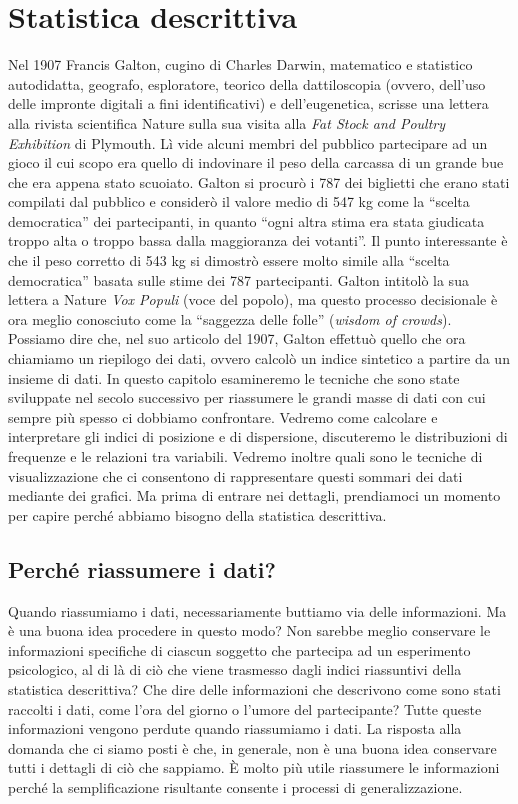 \chapter{Statistica descrittiva}
\label{chapter:descriptive_stats}


Nel 1907 Francis Galton, cugino di Charles Darwin, matematico e statistico autodidatta, geografo, esploratore, teorico della dattiloscopia (ovvero, dell'uso delle impronte digitali a fini identificativi) e dell'eugenetica, scrisse una lettera alla rivista scientifica Nature sulla sua visita alla \emph{Fat Stock and Poultry Exhibition} di Plymouth. 
Lì vide alcuni membri del pubblico partecipare ad un gioco il cui scopo era quello di  indovinare il peso della carcassa di un grande bue che era appena stato scuoiato.
Galton si procurò i 787 dei biglietti che erano stati compilati dal pubblico e considerò il valore medio di 547 kg come la \enquote{scelta democratica} dei partecipanti, in quanto \enquote{ogni altra stima era stata giudicata troppo alta o troppo bassa dalla maggioranza dei votanti}.
Il punto interessante è che il peso corretto di 543 kg si dimostrò essere molto simile alla \enquote{scelta democratica} basata sulle stime dei 787 partecipanti. 
Galton intitolò la sua lettera a Nature \emph{Vox Populi} (voce del popolo), ma questo processo decisionale è ora meglio conosciuto come la \enquote{saggezza delle folle} (\emph{wisdom of crowds}).
Possiamo dire che, nel suo articolo del 1907, Galton effettuò quello che ora chiamiamo un riepilogo dei dati, ovvero calcolò un indice sintetico a partire da un insieme di dati.
In questo capitolo esamineremo le tecniche che sono state sviluppate nel secolo successivo per riassumere le grandi masse di dati con cui sempre più spesso ci dobbiamo confrontare.
Vedremo come calcolare e interpretare gli indici di posizione e di dispersione, discuteremo le distribuzioni di frequenze e le relazioni tra variabili.
Vedremo inoltre quali sono le tecniche di visualizzazione che ci consentono di rappresentare questi sommari dei dati mediante dei grafici. 
Ma prima di entrare nei dettagli, prendiamoci un momento per capire perché abbiamo bisogno della statistica descrittiva.


\section{Perché riassumere i dati?}

Quando riassumiamo i dati, necessariamente buttiamo via delle informazioni. 
Ma è una buona idea procedere in questo modo? 
Non sarebbe meglio conservare le informazioni specifiche di ciascun soggetto che partecipa ad un esperimento psicologico, al di là di ciò che viene trasmesso dagli indici riassuntivi della statistica descrittiva? 
Che dire delle informazioni che descrivono come sono stati raccolti i dati, come l'ora del giorno o l'umore del partecipante? 
Tutte queste informazioni vengono perdute quando riassumiamo i dati.
La risposta alla domanda che ci siamo posti è che, in generale, non è una buona idea conservare tutti i dettagli di ciò che sappiamo.
È molto più utile riassumere le informazioni perché la semplificazione risultante consente i processi di generalizzazione.

